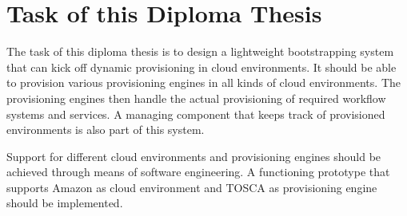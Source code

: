 \section{Task of this Diploma Thesis}

The task of this diploma thesis is to design a lightweight bootstrapping system that can kick off dynamic provisioning in cloud environments.
It should be able to provision various provisioning engines in all kinds of cloud environments.
The provisioning engines then handle the actual provisioning of required workflow systems and services.
A managing component that keeps track of provisioned environments is also part of this system.

Support for different cloud environments and provisioning engines should be achieved through means of software engineering.
A functioning prototype that supports Amazon as cloud environment and TOSCA as provisioning engine should be implemented.
